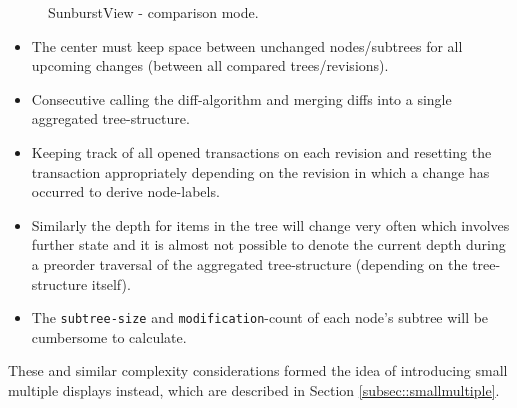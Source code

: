 \begin{figure}[tb]
\caption{\label{fig:sunburst} SunburstView - comparison mode.}
\end{figure}

\begin{itemize}
\item The center must keep space between unchanged nodes/subtrees for all upcoming changes (between all compared trees/revisions).
\item Consecutive calling the diff-algorithm and merging diffs into a single aggregated tree-structure.
\item Keeping track of all opened transactions on each revision and resetting the transaction appropriately depending on the revision in which a change has occurred to derive node-labels.
\item Similarly the depth for items in the tree will change very often which involves further state and it is almost not possible to denote the current depth during a preorder traversal of the aggregated tree-structure (depending on the tree-structure itself).
\item The \texttt{subtree-size} and \texttt{modification}-count of each node's subtree will be cumbersome to calculate.
\end{itemize}

These and similar complexity considerations formed the idea of introducing small multiple displays instead, which are described in Section \ref{subsec::smallmultiple}.


